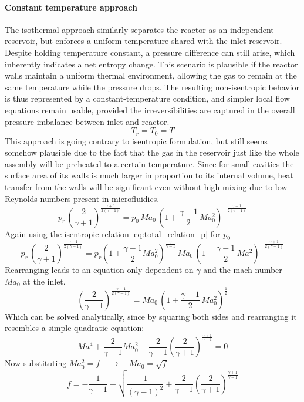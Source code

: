 \paragraph{Constant temperature approach}
	The isothermal approach similarly separates the reactor as an independent reservoir, but enforces a uniform temperature shared with the inlet reservoir.
	Despite holding temperature constant, a pressure difference can still arise, which inherently indicates a net entropy change.
	This scenario is plausible if the reactor walls maintain a uniform thermal environment, allowing the gas to remain at the same temperature while the pressure drops.
	The resulting non-isentropic behavior is thus represented by a constant-temperature condition, and simpler local flow equations remain usable, provided the irreversibilities are captured in the overall pressure imbalance between inlet and reactor. 
	$$
		T_r = T_0 = T
	$$
	This approach is going contrary to isentropic formulation, but still seems somehow plausible due to the fact that the gas in the reservoir just like the whole assembly will be preheated to a certain temperature.
	Since for small cavities the surface area of its walls is much larger in proportion to its internal volume, heat transfer from the walls will be significant even without high mixing due to low Reynolds numbers present in microfluidics.
	$$
		p_r\, \left(\frac{2}{\gamma+1}\right)^{\frac{\gamma+1}{2(\gamma-1)}}
		=  p_0\, Ma_0\,\left(1+\frac{\gamma-1}{2}\,Ma_0^2\right)^{-\frac{\gamma+1}{2(\gamma-1)}}
	$$
	Again using the isentropic relation \eqref{eq:total_relation_p} for $p_0$
	$$
		p_r\, \left(\frac{2}{\gamma+1}\right)^{\frac{\gamma+1}{2(\gamma-1)}}
		=  p_r \left(1 + \frac{\gamma - 1}{2}Ma_0^2 \right)^{\frac{\gamma}{\gamma - 1}}\, Ma_0\,\left(1+\frac{\gamma-1}{2}\,Ma^2\right)^{-\frac{\gamma+1}{2(\gamma-1)}}
	$$
	Rearranging leads to an equation only dependent on $\gamma$ and the mach number $Ma_0$ at the inlet.
	$$
		\left(\frac{2}{\gamma+1}\right)^{\frac{\gamma+1}{2(\gamma-1)}}
		=  Ma_0\,\left(1+\frac{\gamma-1}{2}\,Ma_0^2\right)^{\frac{1}{2}}
	$$
	Which can be solved analytically, since by squaring both sides and rearranging it resembles a simple quadratic equation:
	\begin{equation}
		Ma^4 + \frac{2}{\gamma - 1}Ma_0^2 - \frac{2}{\gamma -1}\left(\frac{2}{\gamma + 1}\right)^{\frac{\gamma + 1}{\gamma - 1}} = 0
	\end{equation}
	Now substituting $Ma_0^2 = f \quad \to \quad Ma_0 = \sqrt{f}$
	\begin{equation}
		f = -\frac{1}{\gamma - 1} \pm \sqrt{\frac{1}{(\gamma - 1)^2}
		+ \frac{2}{\gamma -1}\left(\frac{2}{\gamma + 1}\right)^{\frac{\gamma + 1}{\gamma - 1}}}
	\end{equation}
